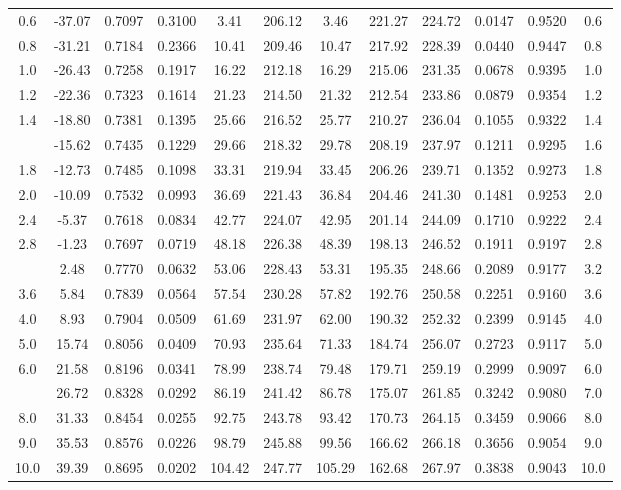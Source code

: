 \documentclass[12pt,a3paper]{article}
\begin{document}
\begin{enumerate}
\begin{center}
\begin{longtable}{c c c c c c c c c c c c}
0.6 & -37.07 & 0.7097 & 0.3100 & 3.41 & 206.12 & 3.46 & 221.27 & 224.72 & 0.0147 & 0.9520 & 0.6 \\
0.8 & -31.21 & 0.7184 & 0.2366 & 10.41 & 209.46 & 10.47 & 217.92 & 228.39 & 0.0440 & 0.9447 & 0.8 \\
1.0 & -26.43 & 0.7258 & 0.1917 & 16.22 & 212.18 & 16.29 & 215.06 & 231.35 & 0.0678 & 0.9395 & 1.0 \\
1.2 & -22.36 & 0.7323 & 0.1614 & 21.23 & 214.50 & 21.32 & 212.54 & 233.86 & 0.0879 & 0.9354 & 1.2 \\
1.4 & -18.80 & 0.7381 & 0.1395 & 25.66 & 216.52 & 25.77 & 210.27 & 236.04 & 0.1055 & 0.9322 & 1.4 \\
\addlinespace
1.6 & -15.62 & 0.7435 & 0.1229 & 29.66 & 218.32 & 29.78 & 208.19 & 237.97 & 0.1211 & 0.9295 & 1.6 \\
1.8 & -12.73 & 0.7485 & 0.1098 & 33.31 & 219.94 & 33.45 & 206.26 & 239.71 & 0.1352 & 0.9273 & 1.8 \\
2.0 & -10.09 & 0.7532 & 0.0993 & 36.69 & 221.43 & 36.84 & 204.46 & 241.30 & 0.1481 & 0.9253 & 2.0 \\
2.4 & -5.37 & 0.7618 & 0.0834 & 42.77 & 224.07 & 42.95 & 201.14 & 244.09 & 0.1710 & 0.9222 & 2.4 \\
2.8 & -1.23 & 0.7697 & 0.0719 & 48.18 & 226.38 & 48.39 & 198.13 & 246.52 & 0.1911 & 0.9197 & 2.8 \\
\addlinespace
3.2 & 2.48 & 0.7770 & 0.0632 & 53.06 & 228.43 & 53.31 & 195.35 & 248.66 & 0.2089 & 0.9177 & 3.2 \\
3.6 & 5.84 & 0.7839 & 0.0564 & 57.54 & 230.28 & 57.82 & 192.76 & 250.58 & 0.2251 & 0.9160 & 3.6 \\
4.0 & 8.93 & 0.7904 & 0.0509 & 61.69 & 231.97 & 62.00 & 190.32 & 252.32 & 0.2399 & 0.9145 & 4.0 \\
5.0 & 15.74 & 0.8056 & 0.0409 & 70.93 & 235.64 & 71.33 & 184.74 & 256.07 & 0.2723 & 0.9117 & 5.0 \\
6.0 & 21.58 & 0.8196 & 0.0341 & 78.99 & 238.74 & 79.48 & 179.71 & 259.19 & 0.2999 & 0.9097 & 6.0 \\
\addlinespace
7.0 & 26.72 & 0.8328 & 0.0292 & 86.19 & 241.42 & 86.78 & 175.07 & 261.85 & 0.3242 & 0.9080 & 7.0 \\
8.0 & 31.33 & 0.8454 & 0.0255 & 92.75 & 243.78 & 93.42 & 170.73 & 264.15 & 0.3459 & 0.9066 & 8.0 \\
9.0 & 35.53 & 0.8576 & 0.0226 & 98.79 & 245.88 & 99.56 & 166.62 & 266.18 & 0.3656 & 0.9054 & 9.0 \\
10.0 & 39.39 & 0.8695 & 0.0202 & 104.42 & 247.77 & 105.29 & 162.68 & 267.97 & 0.3838 & 0.9043 & 10.0 \\

\end{longtable}
\end{center}
\end{enumerate}
\end{document}
